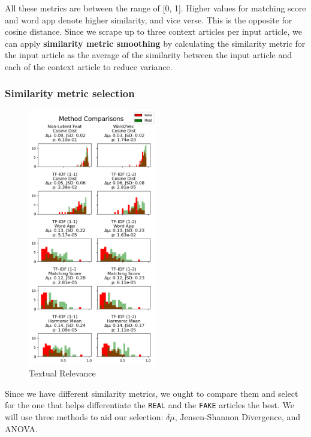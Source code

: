 \documentclass{article}
\begin{document}
All these metrics are between the range of [0, 1]. Higher values for matching score and word app denote higher similarity, and vice verse. This is the opposite for cosine distance. Since we scrape up to three context articles per input article, we can apply \textbf{similarity metric smoothing} by calculating the similarity metric for the input article as the average of the similarity between the input article and each of the context article to reduce variance.

\subsubsection{Similarity metric selection}
\begin{figure}
\vspace*{-20pt}
\centering
\includegraphics[width=0.5\textwidth]{img/textual_relevance_2.png}
\caption{Textual Relevance}
\label{similarity-metrics}
\end{figure}
Since we have different similarity metrics, we ought to compare them and select for the one that helps differentiate the \texttt{REAL} and the \texttt{FAKE} articles the best. We will use three methods to aid our selection: $\delta \mu$, Jensen-Shannon Divergence, and ANOVA.
\end{document}
